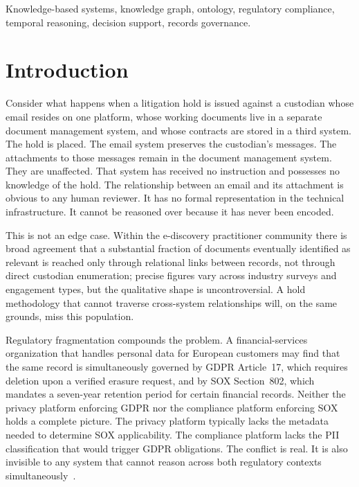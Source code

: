 \documentclass{ieeeaccess}
\begin{document}
\begin{keywords}
Knowledge-based systems, knowledge graph, ontology, regulatory compliance, temporal reasoning, decision support, records governance.
\end{keywords}

\maketitle

\section{Introduction}

Consider what happens when a litigation hold is issued against a custodian whose email resides on one platform, whose working documents live in a separate document management system, and whose contracts are stored in a third system. The hold is placed. The email system preserves the custodian's messages. The attachments to those messages remain in the document management system. They are unaffected. That system has received no instruction and possesses no knowledge of the hold. The relationship between an email and its attachment is obvious to any human reviewer. It has no formal representation in the technical infrastructure. It cannot be reasoned over because it has never been encoded.

This is not an edge case. Within the e-discovery practitioner community there is broad agreement that a substantial fraction of documents eventually identified as relevant is reached only through relational links between records, not through direct custodian enumeration; precise figures vary across industry surveys and engagement types, but the qualitative shape is uncontroversial. A hold methodology that cannot traverse cross-system relationships will, on the same grounds, miss this population.

Regulatory fragmentation compounds the problem. A financial-services organization that handles personal data for European customers may find that the same record is simultaneously governed by GDPR Article~17, which requires deletion upon a verified erasure request, and by SOX Section~802, which mandates a seven-year retention period for certain financial records. Neither the privacy platform enforcing GDPR nor the compliance platform enforcing SOX holds a complete picture. The privacy platform typically lacks the metadata needed to determine SOX applicability. The compliance platform lacks the PII classification that would trigger GDPR obligations. The conflict is real. It is also invisible to any system that cannot reason across both regulatory contexts simultaneously~\cite{edrm,iso15489}.
\end{document}
